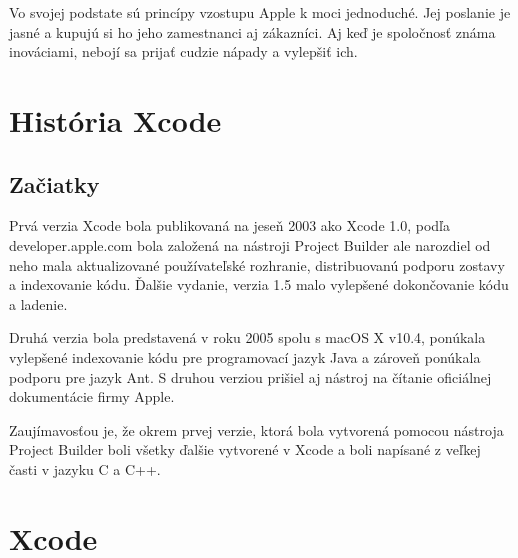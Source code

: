 \documentclass[12pt]{article}
\begin{document}
			Vo svojej podstate sú princípy vzostupu Apple k moci jednoduché. Jej poslanie je jasné a kupujú si ho jeho zamestnanci aj zákazníci. Aj keď je spoločnosť známa inováciami, nebojí sa prijať cudzie nápady a vylepšiť ich. \cite {applesuc}


	\newpage
		\section{História Xcode}
		\subsection{Začiatky}
			Prvá verzia Xcode bola publikovaná na jeseň 2003 ako Xcode 1.0,  podľa developer.apple.com bola založená na nástroji Project Builder ale narozdiel od neho mala aktualizované používateľské rozhranie,  distribuovanú podporu zostavy a indexovanie kódu.  Ďalšie vydanie,  verzia 1.5 malo vylepšené dokončovanie kódu a ladenie.  \cite{xcodewiki} \par
			Druhá verzia bola predstavená v roku 2005 spolu s macOS X v10.4,  ponúkala vylepšené indexovanie kódu pre programovací jazyk Java a zároveň ponúkala podporu pre jazyk Ant.  S druhou verziou prišiel aj nástroj na čítanie oficiálnej dokumentácie firmy Apple.  \cite{xcodewiki} \par
			Zaujímavosťou je, že okrem prvej verzie, ktorá bola vytvorená pomocou nástroja Project Builder boli všetky ďalšie vytvorené v Xcode a boli napísané z veľkej časti v jazyku C a C++.

	\newpage
		\section{Xcode}
\end{document}
